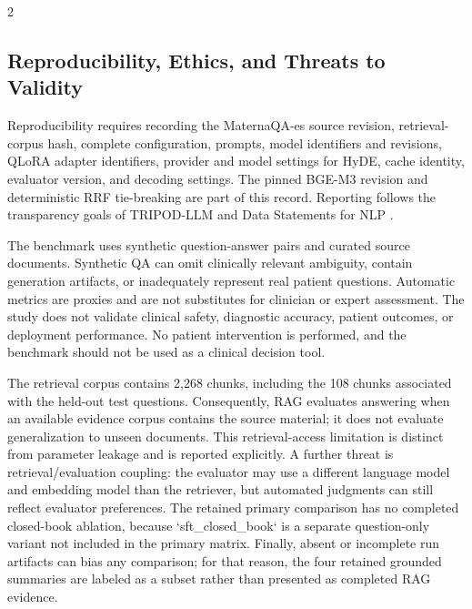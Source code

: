 \documentclass[11pt]{article}
\begin{document}
\begin{multicols}{2}
\subsection{Reproducibility, Ethics, and Threats to Validity}

Reproducibility requires recording the MaternaQA-es source revision, retrieval-corpus hash, complete configuration, prompts, model identifiers and revisions, QLoRA adapter identifiers, provider and model settings for HyDE, cache identity, evaluator version, and decoding settings. The pinned BGE-M3 revision and deterministic RRF tie-breaking are part of this record. Reporting follows the transparency goals of TRIPOD-LLM and Data Statements for NLP \cite{Gallifant2025TRIPODLLM,Bender2018DataStatements}.

The benchmark uses synthetic question-answer pairs and curated source documents. Synthetic QA can omit clinically relevant ambiguity, contain generation artifacts, or inadequately represent real patient questions. Automatic metrics are proxies and are not substitutes for clinician or expert assessment. The study does not validate clinical safety, diagnostic accuracy, patient outcomes, or deployment performance. No patient intervention is performed, and the benchmark should not be used as a clinical decision tool.

The retrieval corpus contains 2,268 chunks, including the 108 chunks associated with the held-out test questions. Consequently, RAG evaluates answering when an available evidence corpus contains the source material; it does not evaluate generalization to unseen documents. This retrieval-access limitation is distinct from parameter leakage and is reported explicitly. A further threat is retrieval/evaluation coupling: the evaluator may use a different language model and embedding model than the retriever, but automated judgments can still reflect evaluator preferences. The retained primary comparison has no completed closed-book ablation, because `sft\_closed\_book` is a separate question-only variant not included in the primary matrix. Finally, absent or incomplete run artifacts can bias any comparison; for that reason, the four retained grounded summaries are labeled as a subset rather than presented as completed RAG evidence.
\end{multicols}
\end{document}
